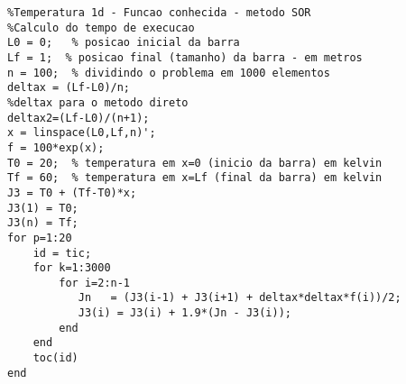\lstset{language=Matlab}
\begin{lstlisting}
%Temperatura 1d - Funcao conhecida - metodo SOR  
%Calculo do tempo de execucao
L0 = 0;   % posicao inicial da barra
Lf = 1;  % posicao final (tamanho) da barra - em metros
n = 100;  % dividindo o problema em 1000 elementos
deltax = (Lf-L0)/n;
%deltax para o metodo direto
deltax2=(Lf-L0)/(n+1);
x = linspace(L0,Lf,n)';
f = 100*exp(x);
T0 = 20;  % temperatura em x=0 (inicio da barra) em kelvin
Tf = 60;  % temperatura em x=Lf (final da barra) em kelvin
J3 = T0 + (Tf-T0)*x;
J3(1) = T0;
J3(n) = Tf;
for p=1:20
	id = tic;
	for k=1:3000
	    for i=2:n-1     
	       Jn   = (J3(i-1) + J3(i+1) + deltax*deltax*f(i))/2;
	       J3(i) = J3(i) + 1.9*(Jn - J3(i));
	    end
	end
	toc(id)
end
\end{lstlisting}